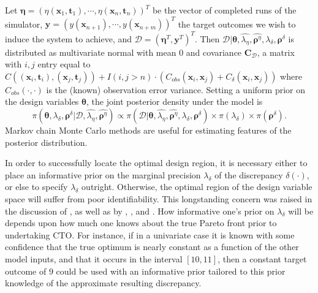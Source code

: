 \documentclass[12pt]{article}
\begin{document}
Let $\boldsymbol \eta = (\eta(\mathbf x_1,\mathbf t_1),\cdots,\eta(\mathbf x_n,\mathbf t_n))^T$ be the vector of completed runs of the simulator, $\mathbf y = (y(\mathbf x_{n+1}),\cdots,y(\mathbf x_{n+m}))^T$ the target outcomes we wish to induce the system to achieve, 
and $\mathcal D = (\boldsymbol \eta^T,\mathbf y^T)^T$.
%
Then $\mathcal D | \boldsymbol \theta,\widehat{\lambda_\eta}, \widehat{\boldsymbol \rho^\eta},\lambda_\delta,\boldsymbol \rho^\delta$ is distributed as multivariate normal with mean 0 and covariance $\mathbf C_\mathcal D$, a matrix with $i,j$ entry equal to 
$
C((\mathbf x_i,\mathbf t_i),(\mathbf x_j,\mathbf t_j)) + I(i,j>n)\cdot(C_{obs}(\mathbf x_i,\mathbf x_j) + C_\delta(\mathbf x_i,\mathbf x_j))
$
where $C_{obs}(\cdot,\cdot)$ is the (known) observation error variance.
%
Setting a uniform prior on the design variables $\boldsymbol\theta$, the joint posterior density under the model is
%
\begin{equation} \label{eq:full_dist}
\pi(\boldsymbol \theta,\lambda_\delta,\boldsymbol \rho^\delta|\mathcal D,\widehat{\lambda_\eta},\widehat{\boldsymbol \rho^\eta})
\propto \pi(\mathcal D | \boldsymbol \theta,\widehat{\lambda_\eta}, \widehat{\boldsymbol \rho^\eta},\lambda_\delta,\boldsymbol \rho^\delta) \times %
\pi(\lambda_\delta) \times \pi(\boldsymbol \rho^\delta).
\end{equation}
%
Markov chain Monte Carlo methods are useful for estimating features of the posterior distribution.

%
In order to successfully locate the optimal design region, it is necessary either to place an informative prior on the marginal precision $\lambda_\delta$ of the discrepancy $\delta(\cdot)$, or else to specify $\lambda_\delta$ outright. 
%
Otherwise, the optimal region of the design variable space will suffer from poor identifiability.
%
This longstanding concern was raised in the discussion of \cite{Kennedy2001}, as well as by \cite{Bayarri2007}, \cite{Tuo2015}, and \cite{Plumlee2017}.
%
How informative one's prior on $\lambda_\delta$ will be depends upon how much one knows about the true Pareto front prior to undertaking CTO.
%
For instance, if in a univariate case it is known with some confidence that the true optimum is nearly constant as a function of the other model inputs, and that it occurs in the interval $[10,11]$, then a constant target outcome of $9$ could be used with an informative prior tailored to this prior knowledge of the approximate resulting discrepancy.
%
\end{document}

